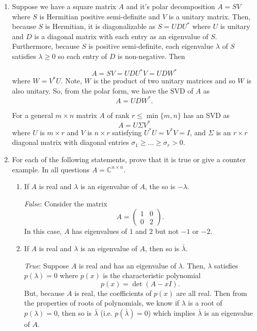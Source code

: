\documentclass[a4paper,12pt]{article}
\newcommand{\comps}{\mathbb{C}}
\newcommand{\pmat}[1]{\begin{pmatrix} #1 \end{pmatrix}}
\begin{document}
\begin{enumerate}[label = (\arabic*)]
	\item Suppose we have a square matrix $ A $ and it's polar decomposition $ A = SV $ where $ S $ is Hermitian positive semi-definite and $ V $ is a unitary matrix. Then, because $ S $ is Hermitian, it is diagonalizable as $ S = U D U^* $ where $ U $ is unitary and $ D $ is a diagonal matrix with each entry as an eigenvalue of $ S $. Furthermore, because $ S $ is positive semi-definite, each eigenvalue $ \lambda $ of $ S $ satisfies $ \lambda \geq 0 $ so each entry of $ D $ is non-negative. Then
	
	\[
		A = SV = U D U^* V = U D W^*
	\]
	where $ W = V^* U $. Note, $ W $ is the product of two unitary matrices and so $ W $ is also unitary. So, from the polar form, we have the SVD of $ A $ as 
	\[
		A = U D W^*.
	\]
	
	For a general $ m \times n $ matrix $ A $ of rank $ r \leq \min\{m, n\} $ has an SVD as
	\[
		A = U \Sigma V^*
	\]
	where $ U $ is $ m \times r $ and $ V $ is $ n \times r $ satisfying $ U^*U = V^*V = I$, and $ \Sigma $ is an $ r \times r $ diagonal matrix with diagonal entries $ \sigma_1 \geq \ldots \geq \sigma_r > 0 $.
	
	\newpage
	\item For each of the following statements, prove that it is true or give a counter example. In all questions $ A = \comps^{n \times n} $.
	\begin{enumerate}[label = (\alph*)]
		\item If $ A $ is real and $ \lambda $ is an eigenvalue of $ A $, the so is $ -\lambda $.
		
		\emph{False}: Consider the matrix
		\[
			A = \pmat{1 & 0 \\ 0 & 2}.
		\]
		In this case, $ A $ has eigenvalues of $ 1 $ and $ 2 $ but not $ -1 $ or $ -2 $.
		
		\item If $ A $ is real and $ \lambda $ is an eigenvalue of $ A $, then so is $ \bar{\lambda} $.
		
		\emph{True}: Suppose $ A $ is real and has an eigenvalue of $ \lambda $. Then, $ \lambda $ satisfies $ p(\lambda) = 0 $ where $ p(x) $ is the characteristic polynomial
		\[
			p(x) = \det(A - xI).
		\]
		But, because $ A $ is real, the coefficients of $ p(x) $ are all real. Then from the properties of roots of polynomials, we know if $ \lambda $ is a root of $ p(\lambda) = 0 $, then so is $ \bar{\lambda} $ (i.e. $ p(\bar{\lambda}) = 0 $) which implies $ \bar{\lambda} $ is an eigenvalue of $ A $.
		

\end{enumerate}
\end{enumerate}
\end{document}
